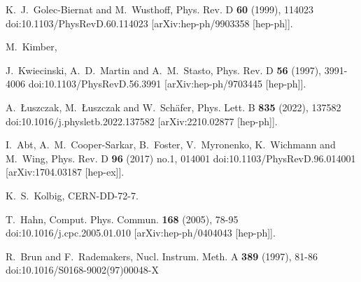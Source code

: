K.~J.~Golec-Biernat and M.~Wusthoff,
Phys. Rev. D \textbf{60} (1999), 114023
doi:10.1103/PhysRevD.60.114023
[arXiv:hep-ph/9903358 [hep-ph]].

M.~Kimber,

J.~Kwiecinski, A.~D.~Martin and A.~M.~Stasto,
Phys. Rev. D \textbf{56} (1997), 3991-4006
doi:10.1103/PhysRevD.56.3991
[arXiv:hep-ph/9703445 [hep-ph]].

A.~\L{}uszczak, M.~\L{}uszczak and W.~Sch\"afer,
Phys. Lett. B \textbf{835} (2022), 137582
doi:10.1016/j.physletb.2022.137582
[arXiv:2210.02877 [hep-ph]].

I.~Abt, A.~M.~Cooper-Sarkar, B.~Foster, V.~Myronenko, K.~Wichmann and M.~Wing,
Phys. Rev. D \textbf{96} (2017) no.1, 014001
doi:10.1103/PhysRevD.96.014001
[arXiv:1704.03187 [hep-ex]].

K.~S.~Kolbig,
CERN-DD-72-7.

T.~Hahn,
Comput. Phys. Commun. \textbf{168} (2005), 78-95
doi:10.1016/j.cpc.2005.01.010
[arXiv:hep-ph/0404043 [hep-ph]].

R.~Brun and F.~Rademakers,
Nucl. Instrum. Meth. A \textbf{389} (1997), 81-86
doi:10.1016/S0168-9002(97)00048-X

